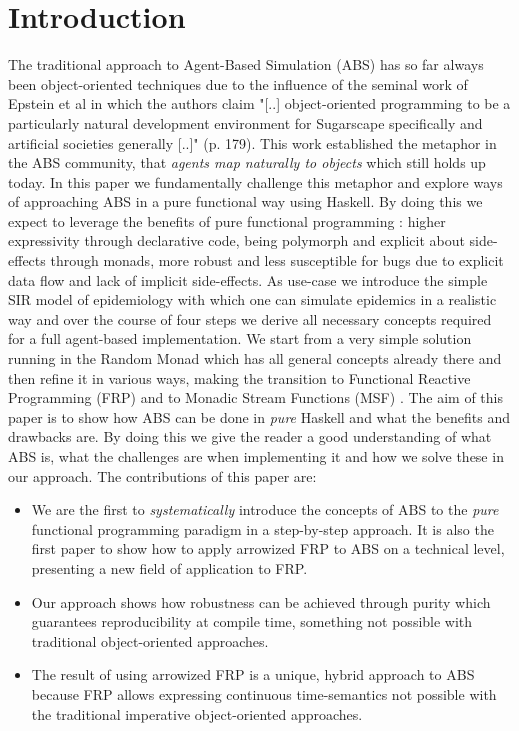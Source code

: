 \section{Introduction}
The traditional approach to Agent-Based Simulation (ABS) has so far always been object-oriented techniques due to the influence of the seminal work of Epstein et al \cite{epstein_growing_1996} in which the authors claim "[..] object-oriented programming to be a particularly natural development environment for Sugarscape specifically and artificial societies generally [..]" (p. 179). This work established the metaphor in the ABS community, that \textit{agents map naturally to objects} \cite{north_managing_2007} which still holds up today.
In this paper we fundamentally challenge this metaphor and explore ways of approaching ABS in a pure functional way using Haskell. By doing this we expect to leverage the benefits of pure functional programming \cite{hudak_history_2007}: higher expressivity through declarative code, being polymorph and explicit about side-effects through monads, more robust and less susceptible for bugs due to explicit data flow and lack of implicit side-effects.
As use-case we introduce the simple SIR model of epidemiology with which one can simulate epidemics in a realistic way and over the course of four steps we derive all necessary concepts required for a full agent-based implementation. We start from a very simple solution running in the Random Monad which has all general concepts already there and then refine it in various ways, making the transition to Functional Reactive Programming (FRP) \cite{wan_functional_2000} and to Monadic Stream Functions (MSF) \cite{perez_functional_2016}.
The aim of this paper is to show how ABS can be done in \textit{pure} Haskell and what the benefits and drawbacks are. By doing this we give the reader a good understanding of what ABS is, what the challenges are when implementing it and how we solve these in our approach.
The contributions of this paper are:

\begin{itemize}
	\item We are the first to \textit{systematically} introduce the concepts of ABS to the \textit{pure} functional programming paradigm in a step-by-step approach. It is also the first paper to show how to apply arrowized FRP to ABS on a technical level, presenting a new field of application to FRP. %
	\item Our approach shows how robustness can be achieved through purity which guarantees reproducibility at compile time, something not possible with traditional object-oriented approaches.
	\item The result of using arrowized FRP is a unique, hybrid approach to ABS because FRP allows expressing continuous time-semantics not possible with the traditional imperative object-oriented approaches.
\end{itemize}

